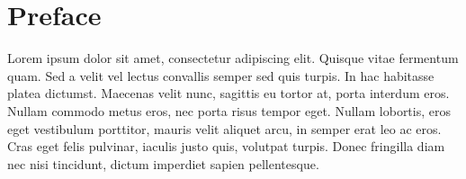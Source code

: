 %

\chapter{Preface}


Lorem ipsum dolor sit amet, consectetur adipiscing elit. Quisque vitae fermentum quam. Sed a velit vel lectus convallis semper sed quis turpis. In hac habitasse platea dictumst. Maecenas velit nunc, sagittis eu tortor at, porta interdum eros. Nullam commodo metus eros, nec porta risus tempor eget. Nullam lobortis, eros eget vestibulum porttitor, mauris velit aliquet arcu, in semper erat leo ac eros. Cras eget felis pulvinar, iaculis justo quis, volutpat turpis. Donec fringilla diam nec nisi tincidunt, dictum imperdiet sapien pellentesque.



